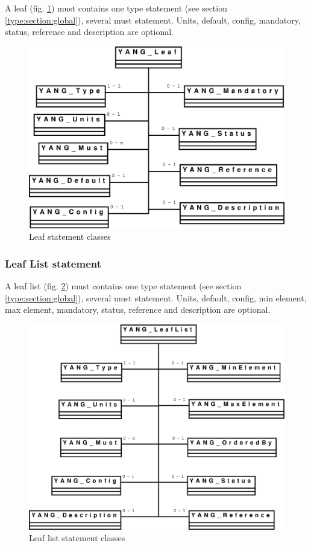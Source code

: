 \documentclass[a4paper]{article}
\begin{document}
A leaf (fig. \ref{leaf}) must contains one type statement (see section
\ref{type:section:global}),  several must  statement.  Units, default,
config, mandatory, status, reference and description are optional.
\begin{figure}[htbp]
\begin{center}
\includegraphics[scale = .3]{leaf.eps}
\end{center}
\caption{Leaf statement classes}
\label{leaf}
\end{figure}

\subsubsection{Leaf List statement}

A leaf  list (fig.  \ref{leaflist})  must contains one  type statement
(see  section   \ref{type:section:global}),  several  must  statement.
Units, default,  config, min element, max  element, mandatory, status,
reference and description are optional.
\begin{figure}[htbp]
\begin{center}
\includegraphics[scale = .3]{leaflist.eps}
\end{center}
\caption{Leaf list statement classes}
\label{leaflist}
\end{figure}
\end{document}
